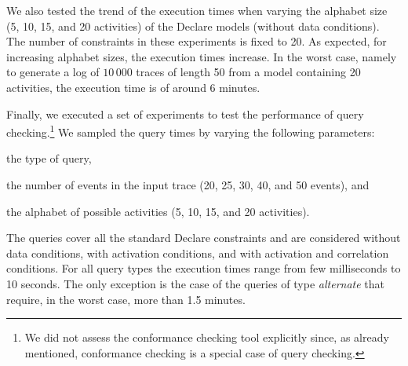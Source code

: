 We also tested the trend of the execution times when varying the alphabet size (5, 10, 15, and 20 activities) of the Declare models (without data conditions). The number of constraints in these experiments is fixed to 20. As expected, for increasing alphabet sizes, the execution times increase. In the worst case, namely to generate a log of $10\,000$ traces of length 50 from a model containing 20 activities, the execution time is of around 6 minutes.

Finally, we executed a set of experiments to test the performance of query checking.\footnote{We did not assess the conformance checking tool explicitly since, as already mentioned, conformance checking is a special case of query checking.} We sampled the query times by varying the following parameters:
\begin{inparaenum}
\item the type of query,
\item the number of events in the input trace (20, 25, 30, 40, and 50 events), and
\item the alphabet of possible activities (5, 10, 15, and 20 activities).
\end{inparaenum}
The queries cover all the standard Declare constraints and are considered without data conditions, with activation conditions, and with activation and correlation conditions. For all query types the execution times range from few milliseconds to 10 seconds. The only exception is the case of the queries of type \emph{alternate} that require, in the worst case, more than 1.5 minutes.
